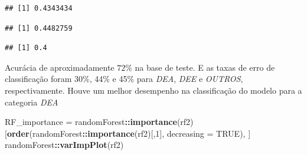 \documentclass[]{article}
\newenvironment{Shaded}{\begin{snugshade}}{\end{snugshade}}
\newcommand{\DataTypeTok}[1]{\textcolor[rgb]{0.13,0.29,0.53}{#1}}
\newcommand{\DecValTok}[1]{\textcolor[rgb]{0.00,0.00,0.81}{#1}}
\newcommand{\KeywordTok}[1]{\textcolor[rgb]{0.13,0.29,0.53}{\textbf{#1}}}
\newcommand{\NormalTok}[1]{#1}
\newcommand{\OperatorTok}[1]{\textcolor[rgb]{0.81,0.36,0.00}{\textbf{#1}}}
\newcommand{\OtherTok}[1]{\textcolor[rgb]{0.56,0.35,0.01}{#1}}
\newcommand{\StringTok}[1]{\textcolor[rgb]{0.31,0.60,0.02}{#1}}
\begin{document}
\begin{verbatim}
## [1] 0.4343434
\end{verbatim}

\begin{Shaded}
\end{Shaded}

\begin{verbatim}
## [1] 0.4482759
\end{verbatim}

\begin{Shaded}
\end{Shaded}

\begin{verbatim}
## [1] 0.4
\end{verbatim}

Acurácia de aproximadamente \(72\%\) na base de teste. E as taxas de
erro de classificação foram 30\%, 44\% e 45\% para \emph{DEA},
\emph{DEE} e \emph{OUTROS}, respectivamente. Houve um melhor desempenho
na classificação do modelo para a categoria \emph{DEA}

\begin{Shaded}
\begin{Highlighting}[]
\NormalTok{RF_importance =}\StringTok{ }\NormalTok{randomForest}\OperatorTok{::}\KeywordTok{importance}\NormalTok{(rf2)[}\KeywordTok{order}\NormalTok{(randomForest}\OperatorTok{::}\KeywordTok{importance}\NormalTok{(rf2)[,}\DecValTok{1}\NormalTok{], }\DataTypeTok{decreasing =} \OtherTok{TRUE}\NormalTok{), ]}
\NormalTok{randomForest}\OperatorTok{::}\KeywordTok{varImpPlot}\NormalTok{(rf2)}
\end{Highlighting}
\end{Shaded}
\end{document}
